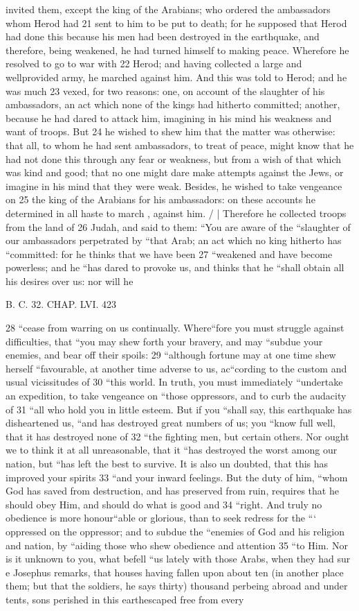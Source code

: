 invited them, except the king of the Arabians; who ordered the ambassadors whom Herod had 21 sent to him to be put to death; for he supposed that Herod had done this because his men had been destroyed in the earthquake, and therefore, being weakened, he had turned himself to making peace. Wherefore he resolved to go to war with 22 Herod; and having collected a large and wellprovided army, he marched against him. 
And this was told to Herod; and he was much 23 vexed, for two reasons: one, on account of the slaughter of his ambassadors, an act which none of the kings had hitherto committed; another, because he had dared to attack him, imagining in his mind his weakness and want of troops. But 24 he wished to shew him that the matter was otherwise: that all, to whom he had sent ambassadors, to treat of peace, might know that he had not done this through any fear or weakness, but from a wish of that which was kind and good; that no one might dare make attempts against the Jews, or imagine in his mind that they were weak. Besides, he wished to take vengeance on 25 the king of the Arabians for his ambassadors: on these accounts he determined in all haste to march , against him. / | 
Therefore he collected troops from the land of 26 Judah, and said to them: “You are aware of the “slaughter of our ambassadors perpetrated by “that Arab; an act which no king hitherto has “committed: for he thinks that we have been 27 “weakened and have become powerless; and he “has dared to provoke us, and thinks that he “shall obtain all his desires over us: nor will he 

B. C. 32. CHAP. LVI. 423 

28 “cease from warring on us continually. Where“fore you must struggle against difficulties, that “you may shew forth your bravery, and may “subdue your enemies, and bear off their spoils: 
29 “although fortune may at one time shew herself “favourable, at another time adverse to us, ac“cording to the custom and usual vicissitudes of 
30 “this world. In truth, you must immediately “undertake an expedition, to take vengeance on “those oppressors, and to curb the audacity of 
31 “all who hold you in little esteem. But if you “shall say, this earthquake has disheartened us, “and has destroyed great numbers of us; you “know full well, that it has destroyed none of 
32 “the fighting men, but certain others. Nor ought we to think it at all unreasonable, that it “has destroyed the worst among our nation, but “has left the best to survive. It is also un doubted, that this has improved your spirits 
33 “and your inward feelings. But the duty of him, “whom God has saved from destruction, and has preserved from ruin, requires that he should obey Him, and should do what is good and 
34 “right. And truly no obedience is more honour“able or glorious, than to seek redress for the “‘ oppressed on the oppressor; and to subdue the “enemies of God and his religion and nation, by “aiding those who shew obedience and attention 
35 “to Him. Nor is it unknown to you, what befell “us lately with those Arabs, when they had sur
e Josephus remarks, that houses having fallen upon about ten (in another place them; but that the soldiers, he says thirty) thousand perbeing abroad and under tents, sons perished in this earthescaped free from every 

